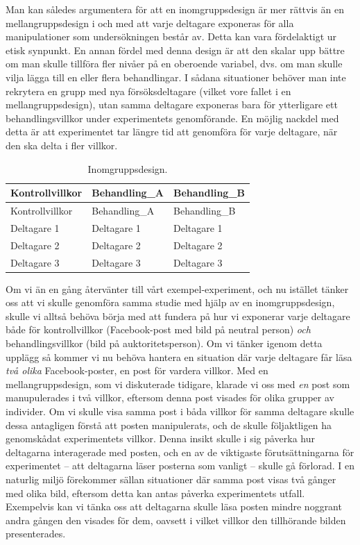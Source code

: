 \documentclass[
]{book}
\begin{document}
Man kan således argumentera för att en inomgruppsdesign är mer rättvis än en mellangruppsdesign i och med att varje deltagare exponeras för alla manipulationer som undersökningen består av. Detta kan vara fördelaktigt ur etisk synpunkt. En annan fördel med denna design är att den skalar upp bättre om man skulle tillföra fler nivåer på en oberoende variabel, dvs. om man skulle vilja lägga till en eller flera behandlingar. I sådana situationer behöver man inte rekrytera en grupp med nya försöksdeltagare (vilket vore fallet i en mellangruppsdesign), utan samma deltagare exponeras bara för ytterligare ett behandlingsvillkor under experimentets genomförande. En möjlig nackdel med detta är att experimentet tar längre tid att genomföra för varje deltagare, när den ska delta i fler villkor.

\begin{longtable}[]{@{}lll@{}}
\caption{\label{tab:tab-02-07-5-4-01}Inomgruppsdesign.}\tabularnewline
\toprule
Kontrollvillkor & Behandling\_A & Behandling\_B\tabularnewline
\midrule
\endfirsthead
\toprule
Kontrollvillkor & Behandling\_A & Behandling\_B\tabularnewline
\midrule
\endhead
Deltagare 1 & Deltagare 1 & Deltagare 1\tabularnewline
Deltagare 2 & Deltagare 2 & Deltagare 2\tabularnewline
Deltagare 3 & Deltagare 3 & Deltagare 3\tabularnewline
\bottomrule
\end{longtable}

Om vi än en gång återvänter till vårt exempel-experiment, och nu istället tänker oss att vi skulle genomföra samma studie med hjälp av en inomgruppsdesign, skulle vi alltså behöva börja med att fundera på hur vi exponerar varje deltagare både för kontrollvillkor (Facebook-post med bild på neutral person) \emph{och} behandlingsvillkor (bild på auktoritetsperson). Om vi tänker igenom detta upplägg så kommer vi nu behöva hantera en situation där varje deltagare får läsa \emph{två olika} Facebook-poster, en post för vardera villkor. Med en mellangruppsdesign, som vi diskuterade tidigare, klarade vi oss med \emph{en} post som manupulerades i två villkor, eftersom denna post visades för olika grupper av individer. Om vi skulle visa samma post i båda villkor för samma deltagare skulle dessa antagligen förstå att posten manipulerats, och de skulle följaktligen ha genomskådat experimentets villkor. Denna insikt skulle i sig påverka hur deltagarna interagerade med posten, och en av de viktigaste förutsättningarna för experimentet -- att deltagarna läser posterna som vanligt -- skulle gå förlorad. I en naturlig miljö förekommer sällan situationer där samma post visas två gånger med olika bild, eftersom detta kan antas påverka experimentets utfall. Exempelvis kan vi tänka oss att deltagarna skulle läsa posten mindre noggrant andra gången den visades för dem, oavsett i vilket villkor den tillhörande bilden presenterades.
\end{document}

